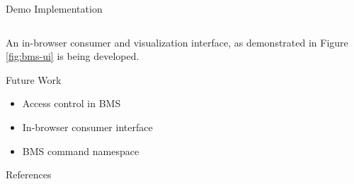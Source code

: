 \documentclass[final,hyperref={pdfpagelabels=false},20pt]{beamer}
\begin{document}
\begin{frame}[t]
\begin{columns}[t]
\begin{column}{.465\textwidth}
\begin{block}{Demo Implementation}
\begin{columns}[T]
\end{columns}

\vspace{10mm}

An in-browser consumer and visualization interface, as demonstrated in Figure \ref{fig:bms-ui} is being developed.

\end{block}


\begin{block}{Future Work}
\begin{itemize}
\item Access control in BMS
\item In-browser consumer interface
\item BMS command namespace
\end{itemize}
\end{block}


\begin{block}{References}
        
\nocite{*}
\small{
}

\end{block}







\end{column}
\end{columns}
\end{frame}
\end{document}
